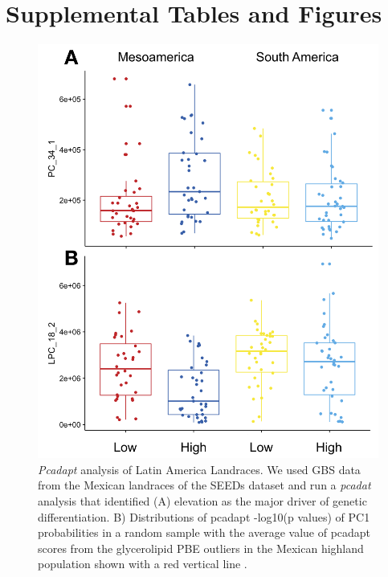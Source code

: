 \documentclass[9pt,twocolumn,twoside,lineno]{gsajnl}
\begin{document}
\clearpage

\section*{Supplemental Tables and Figures}

\renewcommand{\thefigure}{S\arabic{figure}}
\linenumbers

\setcounter{figure}{0}

\begin{figure}[t]
\begin{center}
\includegraphics[width=0.4\paperwidth]{Sup_Figures/Sup_Fig_1.png}
\caption{\textit{Pcadapt} analysis of Latin America Landraces. We used GBS data from the Mexican landraces of the SEEDs dataset \citep{Romero_Navarro2017-cn} and run a \textit{pcadat} analysis \citep{Luu2017-ws} that identified (A) elevation as the major driver of genetic differentiation. 
B) Distributions of pcadapt -log10(p values) of PC1 probabilities in a random sample with the average value of pcadapt scores from the glycerolipid PBE outliers in the Mexican highland population shown with a red vertical line . 
}
\label{s-fig1}
\end{center}
\end{figure} 
\end{document}
